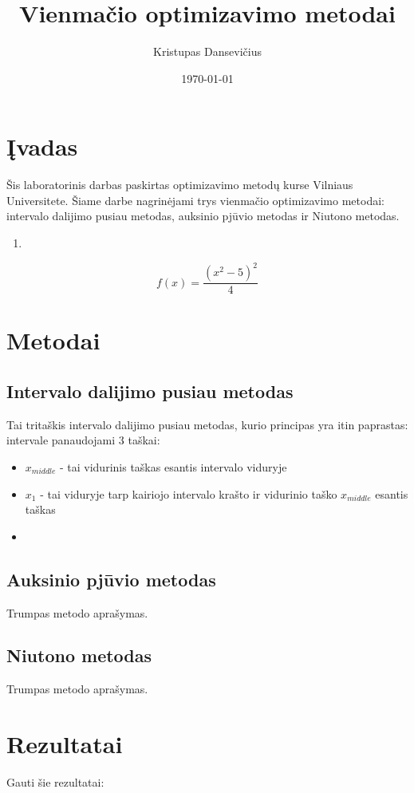 \documentclass[a4paper,12pt]{article}
\title{Vienmačio optimizavimo metodai}
\author{Kristupas Dansevičius}
\date{\today}
\begin{document}
\maketitle
\tableofcontents

\section{Įvadas}
Šis laboratorinis darbas paskirtas optimizavimo metodų kurse Vilniaus Universitete. 
Šiame darbe nagrinėjami trys vienmačio optimizavimo metodai:
intervalo dalijimo pusiau metodas, auksinio pjūvio metodas ir Niutono metodas.

\begin{enumerate}
    \item 
\end{enumerate}

\[
f(x) = \frac{(x^2 - 5)^2}{4}
\]

\section{Metodai}
\subsection{Intervalo dalijimo pusiau metodas}
Tai tritaškis intervalo dalijimo pusiau metodas, kurio principas yra itin paprastas:
intervale panaudojami 3 taškai:
\begin{itemize}
    \item $x_{middle}$ - tai vidurinis taškas esantis intervalo viduryje
    \item $x_1$ - tai viduryje tarp kairiojo intervalo krašto ir vidurinio taško $x_{middle}$ esantis taškas
    \item 
\end{itemize}

\subsection{Auksinio pjūvio metodas}
Trumpas metodo aprašymas.

\subsection{Niutono metodas}
Trumpas metodo aprašymas.

\section{Rezultatai}
Gauti šie rezultatai:
\end{document}
